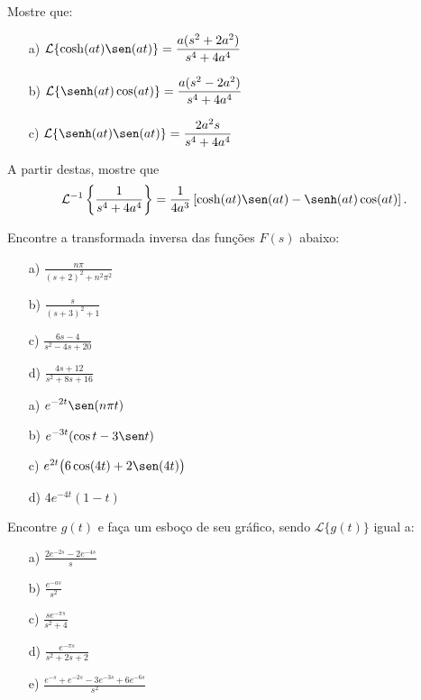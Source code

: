 \begin{exer}
Mostre que:
\begin{itemize}
  \item[a)] $\displaystyle \mathcal{L}\{ \cosh (at) \sen (at) \} = \frac{a (s^2 + 2 a^2)}{s^4 + 4a^4}$
  \item[b)] $\displaystyle \mathcal{L} \{ \senh (at) \cos (at) \} = \frac{a (s^2 - 2 a^2)}{s^4 + 4a^4}$
  \item[c)] $\displaystyle \mathcal{L} \{ \senh (at) \sen (at) \} = \frac{2 a^2 s}{s^4 + 4a^4}$
\end{itemize}
 \noindent A partir destas, mostre que
 \begin{equation}\mathcal{L}^{-1}\left\{ \frac{1}{s^4 + 4a^4}\right\} = \frac{1}{4a^3} \left[\cosh (at) \sen (at) - \senh (at) \cos(at)\right].
 \end{equation}

\end{exer}
\begin{exer}
Encontre a transformada inversa das funções $F(s)$ abaixo:
\begin{itemize}
  \item[a)] $\displaystyle \frac{n\pi}{(s+2)^2 + n^2\pi^2}$
  \item[b)] $\displaystyle \frac{s}{(s+3)^2+1}$
  \item[c)] $\displaystyle \frac{6s-4}{s^2 - 4s +20}$
  \item[d)] $\displaystyle \frac{4s + 12}{s^2 + 8s + 16}$
\end{itemize}
\end{exer}
\begin{resp}
\begin{itemize}
\item[a)] $\displaystyle e^{-2t} \sen (n\pi t)$
  \item[b)] $\displaystyle e^{-3t} (\cos t - 3\sen  t)$
  \item[c)] $e^{2t} \big(6\cos (4t) + 2 \sen (4t)\big)$
  \item[d)] $\displaystyle 4e^{-4t} (1-t)$
\end{itemize}
  \end{resp}
  \begin{exer}
Encontre $g(t)$ e faça um esboço de seu gráfico, sendo $\mathcal{L}\{ g(t)\}$ igual a:
\begin{itemize}
  \item[a)] $\displaystyle \frac{2e^{-2s} - 2 e^{-4s}}{s}$
  \item[b)] $\displaystyle \frac{e^{-as}}{s^2}$
  \item[c)] $\displaystyle \frac{se^{-\pi s}}{s^2+4}$
  \item[d)] $\displaystyle \frac{e^{-\pi s}}{s^2 + 2s +2}$
  \item[e)] $\displaystyle \frac{e^{-s}+ e^{-2s} -3 e^{-3s} +6 e^{-6s}}{s^2}$
\end{itemize}
\end{exer}
